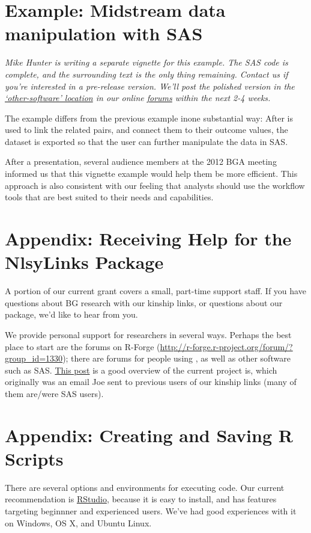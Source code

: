 \documentclass{article}\usepackage[]{graphicx}\usepackage[]{color}
\begin{document}
\section{Example: Midstream data manipulation with SAS}
\emph{Mike Hunter is writing a separate vignette for this example.  The SAS code is complete, and the surrounding text is the only thing remaining.  Contact us if you're interested in a pre-release version.  We'll post the polished version in the \href{https://r-forge.r-project.org/forum/forum.php?forum_id=4316&group_id=1330}{`other-software' location} in our online \href{https://r-forge.r-project.org/forum/?group_id=1330}{forums} within the next 2-4 weeks. }

The example differs from the previous example  inone substantial way: After \R{} is used to link the related pairs, and connect them to their outcome values, the dataset is exported so that the user can further manipulate the data in SAS.  

After a presentation, several audience members at the 2012 BGA meeting informed us that this vignette example would help them be more efficient.  This approach is also consistent with our feeling that analysts should use the workflow tools that are best suited to their needs and capabilities.

\appendix
\section{Appendix: Receiving Help for the NlsyLinks Package}
\label{sec:ReceivingHelp} A portion of our current grant covers a small, part-time support
staff.  If you have questions about BG research with our kinship links, or
questions about our package, we'd like to hear from you.

We provide personal support for researchers in several ways.  Perhaps the best
place to start are the forums on R-Forge
(\url{http://r-forge.r-project.org/forum/?group_id=1330}); there are forums for
people using \R{}, as well as other software such as SAS.  \href{https://r-forge.r-project.org/forum/forum.php?thread_id=4537&forum_id=4266&group_id=1330}{This
post} is a good overview of the current project is, which originally was an
email Joe sent to previous users of our kinship links (many of them are/were SAS
users).

\section{Appendix: Creating and Saving R Scripts}
\label{sec:RScripts} There are several options and environments for executing \R{} code.  Our current
recommendation is \href{http://rstudio.org/}{RStudio}, because it is easy to
install, and has features targeting beginnner and experienced \R{} users. 
We've had good experiences with it on Windows, OS X, and Ubuntu Linux.
\end{document}
